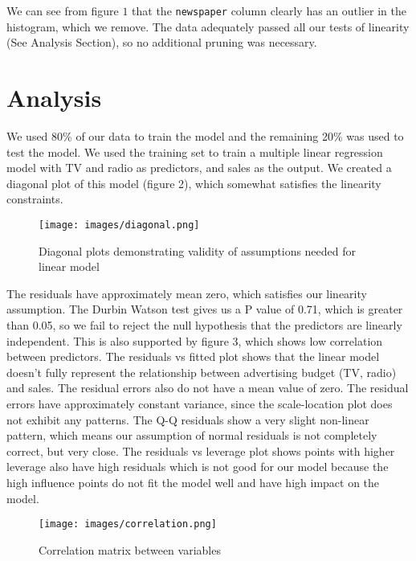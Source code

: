 \documentclass{article}
\begin{document}
We can see from figure $1$ that the \texttt{newspaper} column clearly has an outlier in the histogram, which we remove.  The data adequately passed all our tests of linearity (See Analysis Section), so no additional pruning was necessary.

\section{Analysis}

We used 80\% of our  data to train the model and the remaining 20\% was used to test the model.  We used the training set to train a multiple linear regression model with TV and radio as predictors, and sales as the output.  We created a diagonal plot of this model (figure 2), which somewhat satisfies the linearity constraints.

\begin{figure}[h]
    \centering
    \texttt{[image: images/diagonal.png]}
    \caption{Diagonal plots demonstrating validity of assumptions needed for linear model}
    \label{fig:enter-label}
\end{figure}

The residuals have approximately mean zero, which satisfies our linearity assumption. The Durbin Watson test gives us a P value of 0.71, which is greater than 0.05, so we fail to reject the null hypothesis that the predictors are linearly independent. This is also supported by figure 3, which shows low correlation between predictors. The residuals vs fitted plot shows that the linear model doesn’t fully represent the relationship between advertising budget (TV, radio) and sales. The residual errors also do not have a mean value of zero. The residual errors have approximately constant variance, since the scale-location plot does not exhibit any patterns.  The Q-Q residuals show a very slight non-linear pattern, which means our assumption of normal residuals is not completely correct, but very close. The residuals vs leverage plot shows points with higher leverage also have high residuals which is not good for our model because the high influence points do not fit the model well and have high impact on the model. 

\begin{figure}[h!]
    \centering
    \texttt{[image: images/correlation.png]}
    \caption{Correlation matrix between variables}
    \label{fig:enter-label}
\end{figure}
\end{document}
